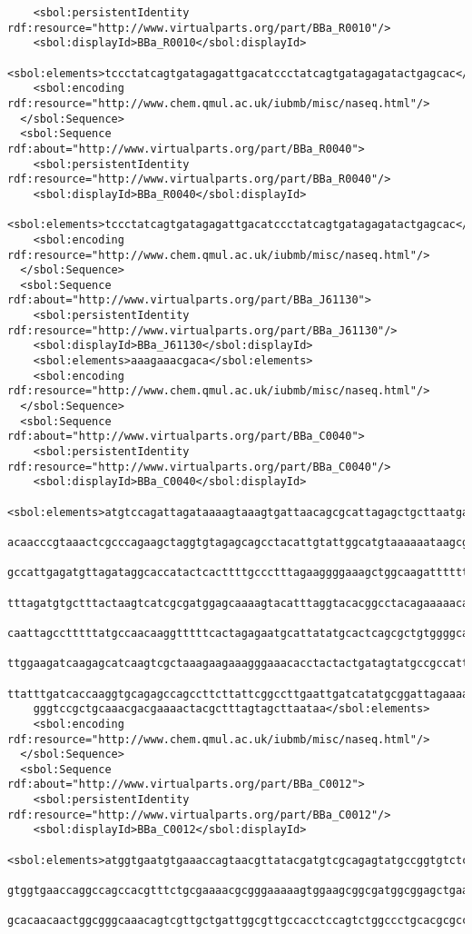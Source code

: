 \begin{lstlisting}
    <sbol:persistentIdentity rdf:resource="http://www.virtualparts.org/part/BBa_R0010"/>
    <sbol:displayId>BBa_R0010</sbol:displayId>
    <sbol:elements>tccctatcagtgatagagattgacatccctatcagtgatagagatactgagcac</sbol:elements>
    <sbol:encoding rdf:resource="http://www.chem.qmul.ac.uk/iubmb/misc/naseq.html"/>
  </sbol:Sequence>
  <sbol:Sequence rdf:about="http://www.virtualparts.org/part/BBa_R0040">
    <sbol:persistentIdentity rdf:resource="http://www.virtualparts.org/part/BBa_R0040"/>
    <sbol:displayId>BBa_R0040</sbol:displayId>
    <sbol:elements>tccctatcagtgatagagattgacatccctatcagtgatagagatactgagcac</sbol:elements>
    <sbol:encoding rdf:resource="http://www.chem.qmul.ac.uk/iubmb/misc/naseq.html"/>
  </sbol:Sequence>
  <sbol:Sequence rdf:about="http://www.virtualparts.org/part/BBa_J61130">
    <sbol:persistentIdentity rdf:resource="http://www.virtualparts.org/part/BBa_J61130"/>
    <sbol:displayId>BBa_J61130</sbol:displayId>
    <sbol:elements>aaagaaacgaca</sbol:elements>
    <sbol:encoding rdf:resource="http://www.chem.qmul.ac.uk/iubmb/misc/naseq.html"/>
  </sbol:Sequence>
  <sbol:Sequence rdf:about="http://www.virtualparts.org/part/BBa_C0040">
    <sbol:persistentIdentity rdf:resource="http://www.virtualparts.org/part/BBa_C0040"/>
    <sbol:displayId>BBa_C0040</sbol:displayId>
    <sbol:elements>atgtccagattagataaaagtaaagtgattaacagcgcattagagctgcttaatgaggtcggaatcgaaggttta
    acaacccgtaaactcgcccagaagctaggtgtagagcagcctacattgtattggcatgtaaaaaataagcgggctttgctcgacgcctta
    gccattgagatgttagataggcaccatactcacttttgccctttagaaggggaaagctggcaagattttttacgtaataacgctaaaagt
    tttagatgtgctttactaagtcatcgcgatggagcaaaagtacatttaggtacacggcctacagaaaaacagtatgaaactctcgaaaat
    caattagcctttttatgccaacaaggtttttcactagagaatgcattatatgcactcagcgctgtggggcattttactttaggttgcgta
    ttggaagatcaagagcatcaagtcgctaaagaagaaagggaaacacctactactgatagtatgccgccattattacgacaagctatcgaa
    ttatttgatcaccaaggtgcagagccagccttcttattcggccttgaattgatcatatgcggattagaaaaacaacttaaatgtgaaagt
    gggtccgctgcaaacgacgaaaactacgctttagtagcttaataa</sbol:elements>
    <sbol:encoding rdf:resource="http://www.chem.qmul.ac.uk/iubmb/misc/naseq.html"/>
  </sbol:Sequence>
  <sbol:Sequence rdf:about="http://www.virtualparts.org/part/BBa_C0012">
    <sbol:persistentIdentity rdf:resource="http://www.virtualparts.org/part/BBa_C0012"/>
    <sbol:displayId>BBa_C0012</sbol:displayId>
    <sbol:elements>atggtgaatgtgaaaccagtaacgttatacgatgtcgcagagtatgccggtgtctcttatcagaccgtttcccgc
    gtggtgaaccaggccagccacgtttctgcgaaaacgcgggaaaaagtggaagcggcgatggcggagctgaattacattcccaaccgcgtg
    gcacaacaactggcgggcaaacagtcgttgctgattggcgttgccacctccagtctggccctgcacgcgccgtcgcaaattgtcgcggcg

\end{lstlisting}
